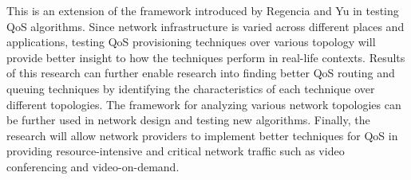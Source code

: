 This is an extension of the framework introduced by Regencia and Yu in testing QoS algorithms. Since network infrastructure is varied across different places and applications, testing QoS provisioning techniques over various topology will provide better insight to how the techniques perform in real-life contexts. Results of this research can further enable research into finding better QoS routing and queuing techniques by identifying the characteristics of each technique over different topologies. The framework for analyzing various network topologies can be further used in network design and testing new algorithms. Finally, the research will allow network providers to implement better techniques for QoS in providing resource-intensive and critical network traffic such as video conferencing and video-on-demand.

